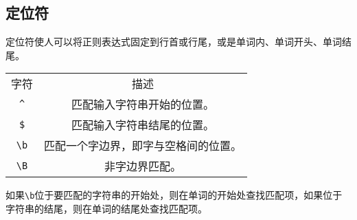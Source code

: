 \documentclass{article}
\begin{document}
\begin{large}
    \subsection{定位符}
    定位符使人可以将正则表达式固定到行首或行尾，或是单词内、单词开头、单词结尾。
    \begin{tabular}{|c|c|}
      \hline
      字符 & 描述 \\
      \verb|^| & 匹配输入字符串开始的位置。 \\
      \hline
      \verb|$| & 匹配输入字符串结尾的位置。\\
      \hline
      \verb|\b| & 匹配一个字边界，即字与空格间的位置。\\
      \hline
      \verb|\B| & 非字边界匹配。\\
      \hline
    \end{tabular}
    如果\verb|\b|位于要匹配的字符串的开始处，则在单词的开始处查找匹配项，如果位于字符串的结尾，则在单词的结尾处查找匹配项。
\end{large}
\end{document}
